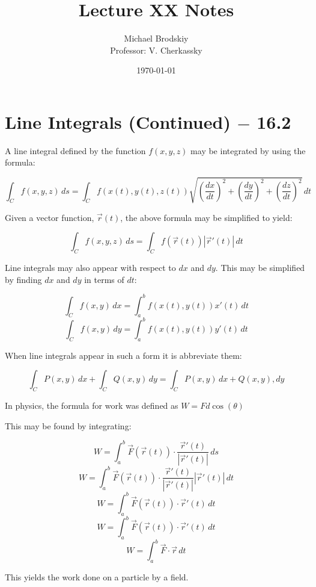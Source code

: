 \documentclass[12pt]{article}
\title{Lecture XX Notes}
\date{\today}
\author{Michael Brodskiy\\ \small Professor: V. Cherkassky}
\begin{document}
\maketitle

\section{Line Integrals (Continued) $-$ 16.2}

A line integral defined by the function $f(x,y,z)$ may be integrated by using the formula:

$$\int_C f(x,y,z)\,ds=\int_C f(x(t),y(t),z(t))\sqrt{\left(\frac{dx}{dt}\right)^2+\left(\frac{dy}{dt}\right)^2+\left(\frac{dz}{dt}\right)^2}\,dt$$

Given a vector function, $\overrightarrow{r}(t)$, the above formula may be simplified to yield:

$$\int_C f(x,y,z)\,ds=\int_C f(\overrightarrow{r}(t))|\overrightarrow{r}'(t)|\,dt$$

Line integrals may also appear with respect to $dx$ and $dy$. This may be simplified by finding $dx$ and $dy$ in terms of $dt$:

$$\int_C f(x,y)\,dx = \int_a^b f(x(t),y(t))x'(t)\,dt$$
$$\int_C f(x,y)\,dy = \int_a^b f(x(t),y(t))y'(t)\,dt$$

When line integrals appear in such a form it is abbreviate them:

$$\int_C P(x,y)\,dx+\int_C Q(x,y)\,dy=\int_C P(x,y)\,dx+Q(x,y),dy$$

In physics, the formula for work was defined as $W=Fd\cos(\theta)$

This may be found by integrating:

$$W=\int_a^b \overrightarrow{F}(\overrightarrow{r}(t))\cdot\frac{\overrightarrow{r}'(t)}{|\overrightarrow{r}'(t)|}\,ds$$
$$W=\int_a^b \overrightarrow{F}(\overrightarrow{r}(t))\cdot\frac{\overrightarrow{r}'(t)}{|\overrightarrow{r}'(t)|}|\overrightarrow{r}'(t)|\,dt$$
$$W=\int_a^b \overrightarrow{F}(\overrightarrow{r}(t))\cdot\overrightarrow{r}'(t)\,dt$$
$$W=\int_a^b \overrightarrow{F}(\overrightarrow{r}(t))\cdot\overrightarrow{r}'(t)\,dt$$
$$W=\int_a^b \overrightarrow{F}\cdot\overrightarrow{r}\,dt$$

This yields the work done on a particle by a field.
\end{document}

